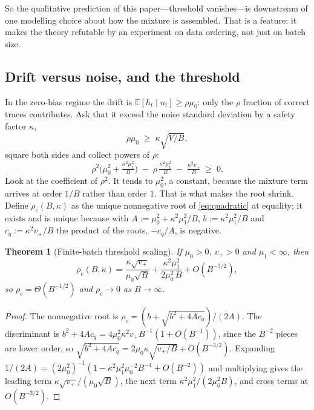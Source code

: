 \documentclass{article}
\theoremstyle{plain}
\newtheorem{theorem}{Theorem}
\theoremstyle{definition}
\theoremstyle{remark}
\newcommand{\E}{\mathbb{E}}
\newcommand{\1}{\mathbf{1}}
\begin{document}
So the qualitative prediction of this paper---threshold vanishes---is downstream
of one modelling choice about how the mixture is assembled. That is a feature: it
makes the theory refutable by an experiment on data ordering, not just on batch
size.

\subsection{Drift versus noise, and the threshold}

In the zero-bias regime the drift is $\E[h_t\mid u_t]\ge\rho\mu_0$: only the
$\rho$ fraction of correct traces contributes. Ask that it exceed the noise
standard deviation by a safety factor $\kappa$,
\[
\rho\mu_0 \;\ge\; \kappa\sqrt{V/B},
\]
square both sides and collect powers of $\rho$:
\begin{equation}
\label{eq:quadratic}
\rho^2\Big(\mu_0^2 + \tfrac{\kappa^2\mu_1^2}{B}\Big)
\;-\; \rho\,\tfrac{\kappa^2\mu_1^2}{B}
\;-\; \tfrac{\kappa^2 v_+}{B} \;\ge\; 0 .
\end{equation}
Look at the coefficient of $\rho^2$. It tends to $\mu_0^2$, a constant, because
the mixture term arrives at order $1/B$ rather than order $1$. That is what makes
the root shrink. Define $\rho_c(B,\kappa)$ as the unique nonnegative root of
\eqref{eq:quadratic} at equality; it exists and is unique because with
$A:=\mu_0^2+\kappa^2\mu_1^2/B$, $b:=\kappa^2\mu_1^2/B$ and $c_q:=\kappa^2v_+/B$
the product of the roots, $-c_q/A$, is negative.

\begin{theorem}[Finite-batch threshold scaling]
\label{thm:scaling}
If $\mu_0 > 0$, $v_+ > 0$ and $\mu_1 <\infty$, then
\begin{equation}
\label{eq:scaling}
\rho_c(B,\kappa)
= \frac{\kappa\sqrt{v_+}}{\mu_0\sqrt B}
+ \frac{\kappa^2\mu_1^2}{2\mu_0^2\,B}
+ O(B^{-3/2}),
\end{equation}
so $\rho_c = \Theta(B^{-1/2})$ and $\rho_c\to0$ as $B\to\infty$.
\end{theorem}

\begin{proof}
The nonnegative root is $\rho_c = (b+\sqrt{b^2+4Ac_q})/(2A)$. The discriminant is
$b^2+4Ac_q = 4\mu_0^2\kappa^2v_+B^{-1}(1+O(B^{-1}))$, since the $B^{-2}$ pieces
are lower order, so $\sqrt{b^2+4Ac_q} = 2\mu_0\kappa\sqrt{v_+/B}+O(B^{-3/2})$.
Expanding $1/(2A) = (2\mu_0^2)^{-1}(1-\kappa^2\mu_1^2\mu_0^{-2}B^{-1}+O(B^{-2}))$
and multiplying gives the leading term $\kappa\sqrt{v_+}/(\mu_0\sqrt B)$, the
next term $\kappa^2\mu_1^2/(2\mu_0^2B)$, and cross terms at $O(B^{-3/2})$.
\end{proof}
\end{document}
